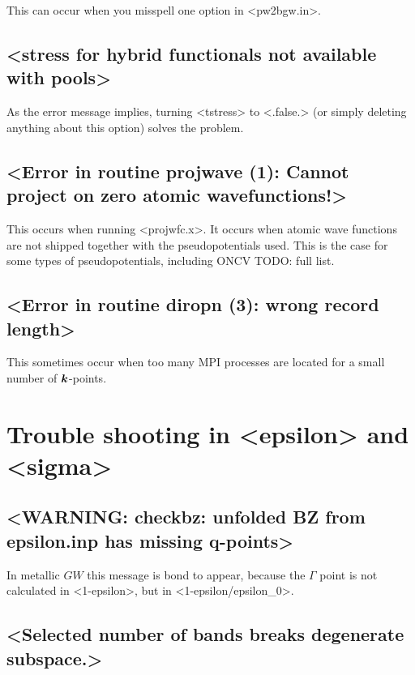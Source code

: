 \documentclass[hyperref, a4paper]{report}
\def\texttt#1{<#1>}%
\newcommand{\shortcode}[1]{\texttt{#1}}
\begin{document}
This can occur when you misspell one option in \shortcode{pw2bgw.in}.

\subsection{\shortcode{stress for hybrid functionals not available with pools}}

As the error message implies,  
turning \shortcode{tstress} to \shortcode{.false.} (or simply deleting anything about this option)
solves the problem.

\subsection{\shortcode{Error in routine projwave (1): Cannot project on zero atomic wavefunctions!}}

This occurs when running \shortcode{projwfc.x}. 
It occurs when atomic wave functions are not shipped together with the pseudopotentials used. 
This is the case for some types of pseudopotentials, 
including ONCV TODO: full list.

\subsection{\shortcode{Error in routine diropn (3): wrong record length}}

This sometimes occur when too many MPI processes are located 
for a small number of $\vb*{k}$-points.

\section{Trouble shooting in \shortcode{epsilon} and \shortcode{sigma}}

\subsection{\shortcode{WARNING: checkbz: unfolded BZ from epsilon.inp has missing q-points}}

In metallic $GW$ this message is bond to appear,
because the $\Gamma$ point is not calculated in \shortcode{1-epsilon},
but in \shortcode{1-epsilon/epsilon_0}.

\subsection{\shortcode{Selected number of bands breaks degenerate subspace.}}\label{sec:degenerate-breaking}
\end{document}
